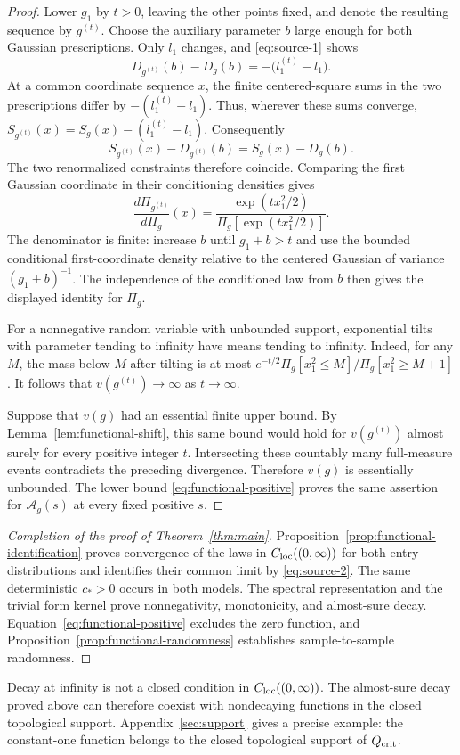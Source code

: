 \begin{proof}
Lower $g_1$ by $t>0$, leaving the other points fixed, and denote the
resulting sequence by $g^{(t)}$.  Choose the auxiliary parameter $b$
large enough for both Gaussian prescriptions.  Only $l_1$ changes,
and \eqref{eq:source-1} shows
\[
 D_{g^{(t)}}(b)-D_g(b)
 =-\big(l_1^{(t)}-l_1\big).
\]
At a common coordinate sequence $x$, the finite centered-square sums
in the two prescriptions differ by $-(l_1^{(t)}-l_1)$.  Thus, wherever
these sums converge,
$S_{g^{(t)}}(x)=S_g(x)-(l_1^{(t)}-l_1)$.  Consequently
\[
 S_{g^{(t)}}(x)-D_{g^{(t)}}(b)=S_g(x)-D_g(b).
\]
The two renormalized constraints therefore coincide.  Comparing the
first Gaussian coordinate in their
conditioning densities gives
\[
 \frac{d\Pi_{g^{(t)}}}{d\Pi_g}(x)
 =\frac{\exp(t x_1^2/2)}{\Pi_g[\exp(t x_1^2/2)]}.
\]
The denominator is finite: increase $b$ until $g_1+b>t$ and use the
bounded conditional first-coordinate density relative to the centered
Gaussian of variance $(g_1+b)^{-1}$.  The independence of the
conditioned law from $b$ then gives the displayed identity for $\Pi_g$.

For a nonnegative random variable with unbounded support, exponential
tilts with parameter tending to infinity have means tending to
infinity.  Indeed, for any $M$, the mass below $M$ after tilting is
at most
$e^{-t/2}\Pi_g[x_1^2\leq M]/\Pi_g[x_1^2\geq M+1]$.
It follows that $v(g^{(t)})\to\infty$ as $t\to\infty$.

Suppose that $v(g)$ had an essential finite upper bound.  By
Lemma~\ref{lem:functional-shift}, this same bound would hold for
$v(g^{(t)})$ almost surely for every positive integer $t$.
Intersecting these countably many full-measure events contradicts
the preceding divergence.  Therefore $v(g)$ is essentially unbounded.
The lower bound \eqref{eq:functional-positive} proves the same assertion
for $\mathcal A_g(s)$ at every fixed positive $s$.
\end{proof}

\begin{proof}[Completion of the proof of Theorem~\ref{thm:main}]
Proposition~\ref{prop:functional-identification} proves convergence of the laws in
$C_{\rm loc}((0,\infty))$ for both entry distributions and identifies
their common limit by \eqref{eq:source-2}.  The same deterministic
$c_*>0$ occurs in both models.  The spectral representation and the
trivial form kernel prove nonnegativity, monotonicity, and almost-sure
decay.  Equation~\eqref{eq:functional-positive} excludes the zero
function, and Proposition~\ref{prop:functional-randomness} establishes
sample-to-sample randomness.
\end{proof}

Decay at infinity is not a closed condition in
$C_{\rm loc}((0,\infty))$.  The almost-sure decay proved above can
therefore coexist with nondecaying functions in the closed topological
support.  Appendix~\ref{sec:support} gives a precise example: the
constant-one function belongs to the closed topological support of
$Q_{\rm crit}$.
